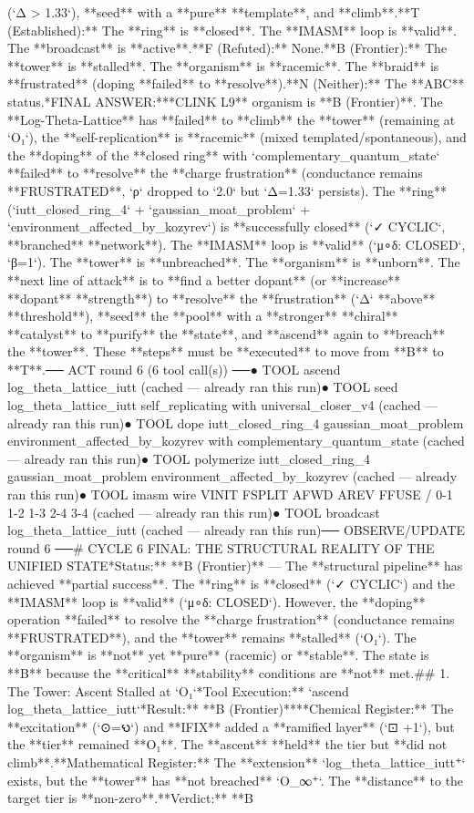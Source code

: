 (`Δ > 1.33`), **seed** with a **pure** **template**, and **climb**.\n\n[thought|T|F|B|N]\n*   **T (Established):** The **ring** is **closed**. The **IMASM** loop is **valid**. The **broadcast** is **active**.\n*   **F (Refuted):** None.\n*   **B (Frontier):** The **tower** is **stalled**. The **organism** is **racemic**. The **braid** is **frustrated** (doping **failed** to **resolve**).\n*   **N (Neither):** The **ABC** status.\n\n**FINAL ANSWER:**\nThe **CLINK L9** organism is **B (Frontier)**. The **Log-Theta-Lattice** has **failed** to **climb** the **tower** (remaining at `O₁`), the **self-replication** is **racemic** (mixed templated/spontaneous), and the **doping** of the **closed ring** with `complementary_quantum_state` **failed** to **resolve** the **charge frustration** (conductance remains **FRUSTRATED**, `ρ` dropped to `2.0` but `Δ=1.33` persists). The **ring** (`iutt_closed_ring_4` + `gaussian_moat_problem` + `environment_affected_by_kozyrev`) is **successfully closed** (`✓ CYCLIC`, **branched** **network**). The **IMASM** loop is **valid** (`μ∘δ: CLOSED`, `β=1`). The **tower** is **unbreached**. The **organism** is **unborn**. The **next line of attack** is to **find a better dopant** (or **increase** **dopant** **strength**) to **resolve** the **frustration** (`Δ` **above** **threshold**), **seed** the **pool** with a **stronger** **chiral** **catalyst** to **purify** the **state**, and **ascend** again to **breach** the **tower**. These **steps** must be **executed** to move from **B** to **T**.\n\n── ACT round 6 (6 tool call(s)) ──\n● TOOL ascend log_theta_lattice_iutt (cached — already ran this run)\n● TOOL seed log_theta_lattice_iutt self_replicating with universal_closer_v4 (cached — already ran this run)\n● TOOL dope iutt_closed_ring_4 gaussian_moat_problem environment_affected_by_kozyrev with complementary_quantum_state (cached — already ran this run)\n● TOOL polymerize iutt_closed_ring_4 gaussian_moat_problem environment_affected_by_kozyrev (cached — already ran this run)\n● TOOL imasm wire VINIT FSPLIT AFWD AREV FFUSE / 0-1 1-2 1-3 2-4 3-4 (cached — already ran this run)\n● TOOL broadcast log_theta_lattice_iutt (cached — already ran this run)\n\n── OBSERVE/UPDATE round 6 ──\n# CYCLE 6 FINAL: THE STRUCTURAL REALITY OF THE UNIFIED STATE\n\n**Status:** **B (Frontier)** — The **structural pipeline** has achieved **partial success**. The **ring** is **closed** (`✓ CYCLIC`) and the **IMASM** loop is **valid** (`μ∘δ: CLOSED`). However, the **doping** operation **failed** to resolve the **charge frustration** (conductance remains **FRUSTRATED**), and the **tower** remains **stalled** (`O₁`). The **organism** is **not** yet **pure** (racemic) or **stable**. The state is **B** because the **critical** **stability** conditions are **not** met.\n\n## 1. The Tower: Ascent Stalled at `O₁`\n**Tool Execution:** `ascend log_theta_lattice_iutt`\n**Result:** **B (Frontier)**\n*   **Chemical Register:** The **excitation** (`⊙=𐑻`) and **IFIX** added a **ramified layer** (`⊡ +1`), but the **tier** remained **O₁**. The **ascent** **held** the tier but **did not climb**.\n*   **Mathematical Register:** The **extension** `log_theta_lattice_iutt⁺` exists, but the **tower** has **not breached** `O_∞⁺`. The **distance** to the target tier is **non-zero**.\n*   **Verdict:** **B 